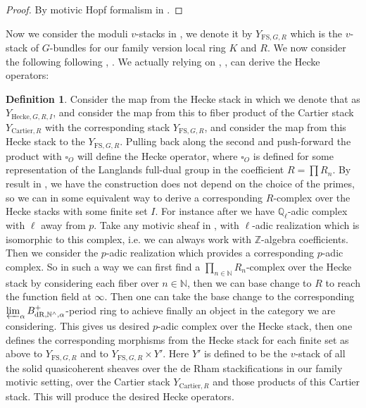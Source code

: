 \documentclass[12pt]{article}
\theoremstyle{definition}
\newtheorem{definition}{Definition}
\begin{document}
\begin{proof}
By motivic Hopf formalism in \cite{2A}.
\end{proof}




\indent Now we consider the moduli $v$-stacks in \cite{2LH}, we denote it by $Y_{\mathrm{FS},G,R}$ which is the $v$-stack of $G$-bundles for our family version local ring $K$ and $R$. We now consider the following following \cite{1FS}, \cite{1GL}. We actually relying on \cite{1FS}, \cite{1S5}, \cite{1S6}  can derive the Hecke operators:

\begin{definition}
Consider the map from the Hecke stack in \cite{2LH} which we denote that as $Y_{\mathrm{Hecke},G,R,I}$, and consider the map from this to fiber product of the Cartier stack $Y_{\mathrm{Cartier},R}$ with the corresponding stack $Y_{\mathrm{FS},G,R}$, and consider the map from this Hecke stack to the $Y_{\mathrm{FS},G,R}$. Pulling back along the second and push-forward the product with $\square_O$ will define the Hecke operator, where $\square_O$ is defined for some representation of the Langlands full-dual group in the coefficient $R=\prod R_n$. By result in \cite{1S5}, \cite{1S6} we have the construction does not depend on the choice of the primes, so we can in some equivalent way to derive a corresponding $R$-complex over the Hecke stacks with some finite set $I$. For instance after \cite{1FS} we have ${\mathbb{Q}}_\ell$-adic complex with $\ell$ away from $p$. Take any motivic sheaf in \cite{1S5}, \cite{1S6} with $\ell$-adic realization which is isomorphic to this complex, i.e. we can always work with $\mathbb{Z}$-algebra coefficients. Then we consider the $p$-adic realization which provides a corresponding $p$-adic complex. So in such a way we can first find a $\prod_{n\in \mathbb{N}}R_n$-complex over the Hecke stack by considering each fiber over $n\in \mathbb{N}$, then we can base change to $R$ to reach the function field at $\infty$. Then one can take the base change to the corresponding $\varprojlim_\alpha B^+_\mathrm{dR,\mathbb{N}^\wedge,\alpha}$-period ring to achieve finally an object in the category we are considering. This gives us desired $p$-adic complex over the Hecke stack, then one defines the corresponding morphisms from the Hecke stack for each finite set as above to $Y_{\mathrm{FS},G,R}$ and to $Y_{\mathrm{FS},G,R}\times Y'$. Here $Y'$ is defined to be the $v$-stack of all the solid quasicoherent sheaves over the de Rham stackifications in our family motivic setting, over the Cartier stack $Y_{\mathrm{Cartier},R}$ and those products of this Cartier stack. This will produce the desired Hecke operators.
\end{definition}
\end{document}

